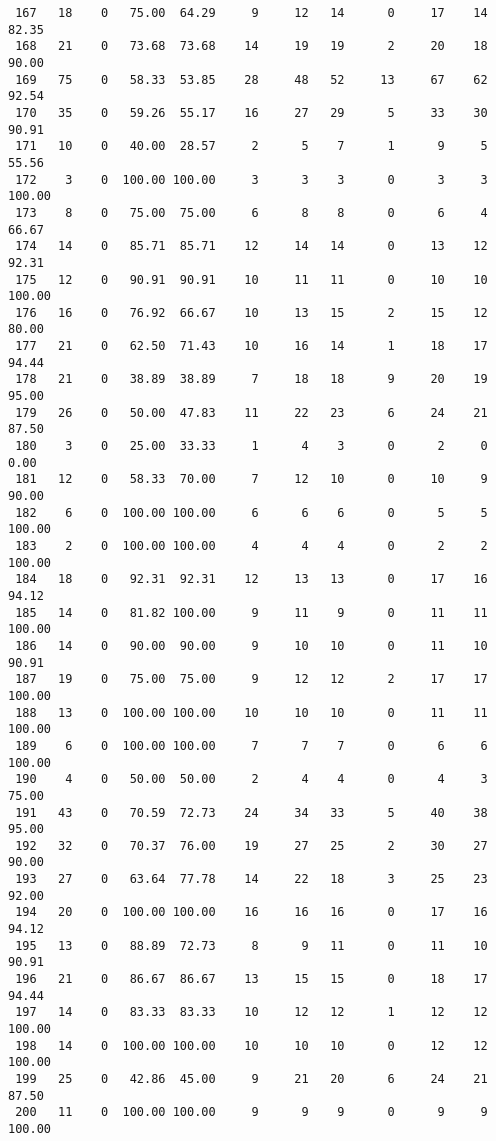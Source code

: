 \begin{verbatim}
 167   18    0   75.00  64.29     9     12   14      0     17    14    82.35
 168   21    0   73.68  73.68    14     19   19      2     20    18    90.00
 169   75    0   58.33  53.85    28     48   52     13     67    62    92.54
 170   35    0   59.26  55.17    16     27   29      5     33    30    90.91
 171   10    0   40.00  28.57     2      5    7      1      9     5    55.56
 172    3    0  100.00 100.00     3      3    3      0      3     3   100.00
 173    8    0   75.00  75.00     6      8    8      0      6     4    66.67
 174   14    0   85.71  85.71    12     14   14      0     13    12    92.31
 175   12    0   90.91  90.91    10     11   11      0     10    10   100.00
 176   16    0   76.92  66.67    10     13   15      2     15    12    80.00
 177   21    0   62.50  71.43    10     16   14      1     18    17    94.44
 178   21    0   38.89  38.89     7     18   18      9     20    19    95.00
 179   26    0   50.00  47.83    11     22   23      6     24    21    87.50
 180    3    0   25.00  33.33     1      4    3      0      2     0     0.00
 181   12    0   58.33  70.00     7     12   10      0     10     9    90.00
 182    6    0  100.00 100.00     6      6    6      0      5     5   100.00
 183    2    0  100.00 100.00     4      4    4      0      2     2   100.00
 184   18    0   92.31  92.31    12     13   13      0     17    16    94.12
 185   14    0   81.82 100.00     9     11    9      0     11    11   100.00
 186   14    0   90.00  90.00     9     10   10      0     11    10    90.91
 187   19    0   75.00  75.00     9     12   12      2     17    17   100.00
 188   13    0  100.00 100.00    10     10   10      0     11    11   100.00
 189    6    0  100.00 100.00     7      7    7      0      6     6   100.00
 190    4    0   50.00  50.00     2      4    4      0      4     3    75.00
 191   43    0   70.59  72.73    24     34   33      5     40    38    95.00
 192   32    0   70.37  76.00    19     27   25      2     30    27    90.00
 193   27    0   63.64  77.78    14     22   18      3     25    23    92.00
 194   20    0  100.00 100.00    16     16   16      0     17    16    94.12
 195   13    0   88.89  72.73     8      9   11      0     11    10    90.91
 196   21    0   86.67  86.67    13     15   15      0     18    17    94.44
 197   14    0   83.33  83.33    10     12   12      1     12    12   100.00
 198   14    0  100.00 100.00    10     10   10      0     12    12   100.00
 199   25    0   42.86  45.00     9     21   20      6     24    21    87.50
 200   11    0  100.00 100.00     9      9    9      0      9     9   100.00

\end{verbatim}
